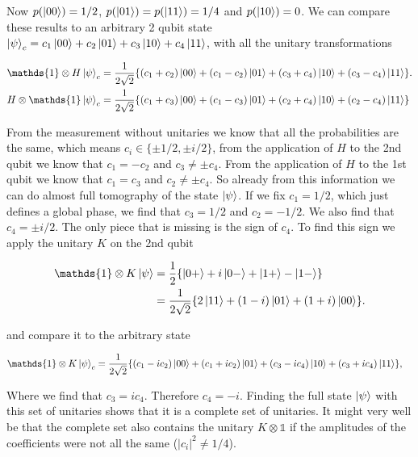 \documentclass[submission, Phys]{SciPost}
\begin{document}
Now $p(\ket{00}) = 1/2$, $p(\ket{01}) = p(\ket{11}) = 1/4$ and $p(\ket{10}) = 0$. We can compare these results to an arbitrary 2 qubit state $\ket{\psi}_c =  c_1 \ket{00} +c_2 \ket{01} + c_3 \ket{10} +c_4 \ket{11}$, with all the unitary transformations

\begin{align}
 \mathds{1}  \otimes H  \ket{\psi}_c&= \frac{1}{2\sqrt{2}} \{ (c_1+c_2) \ket{00} + (c_1 -c_2)\ket{01} + (c_3 + c_4)\ket{10} + (c_3-c_4)\ket{11} \}.\\
 H  \otimes \mathds{1} \ket{\psi}_c&= \frac{1}{2\sqrt{2}} \{ (c_1+c_3) \ket{00} + (c_1 -c_3)\ket{01} + (c_2 + c_4)\ket{10} + (c_2-c_4)\ket{11} \}
\end{align}

From the measurement without unitaries we know that all the probabilities are the same, which means $c_i \in \{ \pm 1/2, \pm i/2 \}$, from the application of $H$ to the 2nd qubit we know that $c_1 = -c_2$ and $c_3 \neq \pm c_4$. From the application of $H$ to the 1st qubit we know that $c_1 = c_3$ and $c_2 \neq \pm c_4$. So already from this information we can do almost full tomography of the state $\ket{\psi}$. If we fix $c_1 = 1/2$, which just defines a global phase, we find that $c_3 = 1/2$ and $c_2 = -1/2$. We also find that $c_4 = \pm i/2$. The only piece that is missing is the sign of $c_4$. To find this sign we apply the unitary $K$ on the 2nd qubit

\begin{align}
\mathds{1} \otimes K \ket{\psi} &= \frac{1}{2} \{ \ket{0+} +i \ket{0-} + \ket{1+} -  \ket{1-} \} \\
&=  \frac{1}{2 \sqrt{2}} \{ 2 \ket{11} + (1-i)\ket{01} + (1+i)\ket{00} \}. 
\end{align}

and compare it to the arbitrary state 

\begin{align}
 \mathds{1}  \otimes K  \ket{\psi}_c&= \frac{1}{2\sqrt{2}} \{ (c_1-ic_2) \ket{00} + (c_1 +ic_2)\ket{01} + (c_3 -ic_4)\ket{10} + (c_3+ic_4)\ket{11} \},
\end{align}

Where we find that $c_3 = ic_4$. Therefore $c_4 = -i$. Finding the full state $\ket{\psi}$ with this set of unitaries shows that it is a complete set of unitaries. It might very well be that the complete set also contains the unitary $K \otimes \mathds{1} $ if the amplitudes of the coefficients were not all the same ($|c_i|^2 \neq 1/4$).
\end{document}
